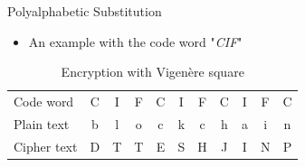 \documentclass[]{beamer}
\begin{document}

\begin{frame}{Polyalphabetic Substitution}
	\begin{itemize}
		\centering
		\item<1-> An example with the code word "\textit{CIF}"
	\end{itemize}
	\renewcommand{\arraystretch}{1.5}
	\begin{table}
		\centering
		\resizebox{9cm}{!} {
			\begin{tabular}{l c c c c c c c c c c }
				\hline
				Code word &C&I&F&C&I&F&C&I&F&C\\
				Plain text &b&l&o&c&k&c&h&a&i&n\\
				Cipher text &D&T&T&E&S&H&J&I&N&P\\
				\hline
			\end{tabular}
		}
		\caption{Encryption with Vigenère square}
	\end{table}
\end{frame}
\end{document}
